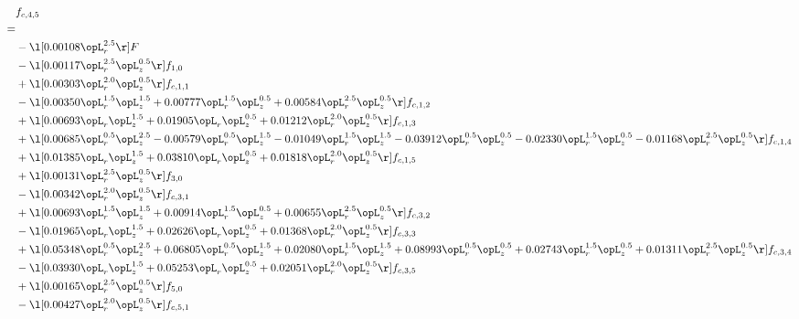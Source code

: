 \begin{alignat}{2} 
\label{eq:f_45_1} 
& f_{c,4,5} \nonumber \\ 
 = \\ 
& - \l[  0.00108 \opL_r^{2.5}  \r] F \nonumber \\ 
& - \l[  0.00117 \opL_r^{2.5} \opL_z^{0.5}  \r] f_{1,0} \nonumber \\ 
& + \l[  0.00303 \opL_r^{2.0} \opL_z^{0.5}  \r] f_{c,1,1} \nonumber \\ 
& - \l[  0.00350 \opL_r^{1.5} \opL_z^{1.5} +  0.00777 \opL_r^{1.5} \opL_z^{0.5} +  0.00584 \opL_r^{2.5} \opL_z^{0.5}  \r] f_{c,1,2} \nonumber \\ 
& + \l[  0.00693 \opL_r \opL_z^{1.5} +  0.01905 \opL_r \opL_z^{0.5} +  0.01212 \opL_r^{2.0} \opL_z^{0.5}  \r] f_{c,1,3} \nonumber \\ 
& + \l[  0.00685 \opL_r^{0.5} \opL_z^{2.5}   -0.00579 \opL_r^{0.5} \opL_z^{1.5}   -0.01049 \opL_r^{1.5} \opL_z^{1.5}   -0.03912 \opL_r^{0.5} \opL_z^{0.5}   -0.02330 \opL_r^{1.5} \opL_z^{0.5}   -0.01168 \opL_r^{2.5} \opL_z^{0.5}  \r] f_{c,1,4} \nonumber \\ 
& + \l[  0.01385 \opL_r \opL_z^{1.5} +  0.03810 \opL_r \opL_z^{0.5} +  0.01818 \opL_r^{2.0} \opL_z^{0.5}  \r] f_{c,1,5} \nonumber \\ 
& + \l[  0.00131 \opL_r^{2.5} \opL_z^{0.5}  \r] f_{3,0} \nonumber \\ 
& - \l[  0.00342 \opL_r^{2.0} \opL_z^{0.5}  \r] f_{c,3,1} \nonumber \\ 
& + \l[  0.00693 \opL_r^{1.5} \opL_z^{1.5} +  0.00914 \opL_r^{1.5} \opL_z^{0.5} +  0.00655 \opL_r^{2.5} \opL_z^{0.5}  \r] f_{c,3,2} \nonumber \\ 
& - \l[  0.01965 \opL_r \opL_z^{1.5} +  0.02626 \opL_r \opL_z^{0.5} +  0.01368 \opL_r^{2.0} \opL_z^{0.5}  \r] f_{c,3,3} \nonumber \\ 
& + \l[  0.05348 \opL_r^{0.5} \opL_z^{2.5} +  0.06805 \opL_r^{0.5} \opL_z^{1.5} +  0.02080 \opL_r^{1.5} \opL_z^{1.5} +  0.08993 \opL_r^{0.5} \opL_z^{0.5} +  0.02743 \opL_r^{1.5} \opL_z^{0.5} +  0.01311 \opL_r^{2.5} \opL_z^{0.5}  \r] f_{c,3,4} \nonumber \\ 
& - \l[  0.03930 \opL_r \opL_z^{1.5} +  0.05253 \opL_r \opL_z^{0.5} +  0.02051 \opL_r^{2.0} \opL_z^{0.5}  \r] f_{c,3,5} \nonumber \\ 
& + \l[  0.00165 \opL_r^{2.5} \opL_z^{0.5}  \r] f_{5,0} \nonumber \\ 
& - \l[  0.00427 \opL_r^{2.0} \opL_z^{0.5}  \r] f_{c,5,1} \nonumber \\ 

\end{alignat}
